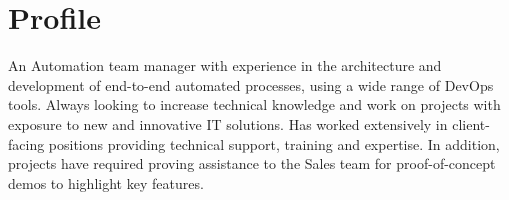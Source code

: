 \section{Profile}

An Automation team manager with experience in the architecture 
and development of end-to-end automated processes, using a wide 
range of DevOps tools. Always looking to increase technical 
knowledge and work on projects with exposure to new and innovative 
IT solutions. Has worked extensively in client-facing positions 
providing technical support, training and expertise. In addition, 
projects have required proving assistance to the Sales team for 
proof-of-concept demos to highlight key features.

\closesection{}
